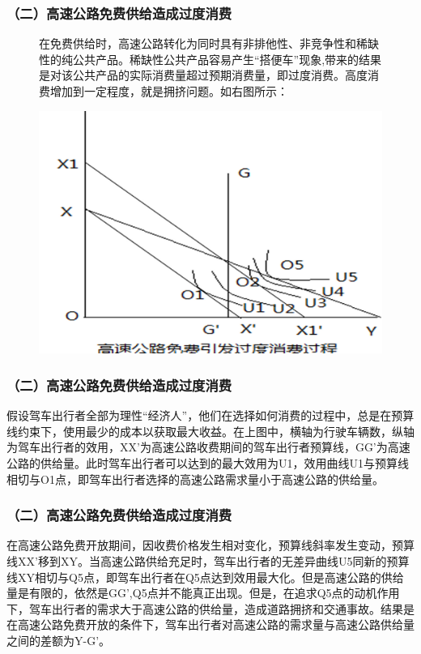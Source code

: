 \documentclass[aspectratio=169, 12pt]{beamer}
\begin{document}
\begin{frame}[plain]
    \frametitle{（二）高速公路免费供给造成过度消费}
    \begin{figure}[]
        \centering
        \begin{minipage}{0.4\linewidth}
            在免费供给时，高速公路转化为同时具有非排他性、非竞争性和稀缺性的纯公共产品。稀缺性公共产品容易产生“搭便车”现象,带来的结果是对该公共产品的实际消费量超过预期消费量，即过度消费。高度消费增加到一定程度，就是拥挤问题。如右图所示：
        \end{minipage}%
        \begin{minipage}{0.6\linewidth}
            \centering
            \includegraphics[width=1.0\textwidth]{./resources/figure/consum.png}
        \end{minipage}
        \end{figure}
\end{frame}

\begin{frame}[plain]
    \frametitle{（二）高速公路免费供给造成过度消费}
    假设驾车出行者全部为理性“经济人”，他们在选择如何消费的过程中，总是在预算线约束下，使用最少的成本以获取最大收益。在上图中，横轴为行驶车辆数，纵轴为驾车出行者的效用，XX’为高速公路收费期间的驾车出行者预算线，GG’为高速公路的供给量。此时驾车出行者可以达到的最大效用为U1，效用曲线U1与预算线相切与O1点，即驾车出行者选择的高速公路需求量小于高速公路的供给量。
\end{frame}

\begin{frame}[plain]
    \frametitle{（二）高速公路免费供给造成过度消费}
    在高速公路免费开放期间，因收费价格发生相对变化，预算线斜率发生变动，预算线XX’移到XY。当高速公路供给充足时，驾车出行者的无差异曲线U5同新的预算线XY相切与Q5点，即驾车出行者在Q5点达到效用最大化。但是高速公路的供给量是有限的，依然是GG’,Q5点并不能真正出现。但是，在追求Q5点的动机作用下，驾车出行者的需求大于高速公路的供给量，造成道路拥挤和交通事故。结果是在高速公路免费开放的条件下，驾车出行者对高速公路的需求量与高速公路供给量之间的差额为Y-G’。
\end{frame}
\end{document}
